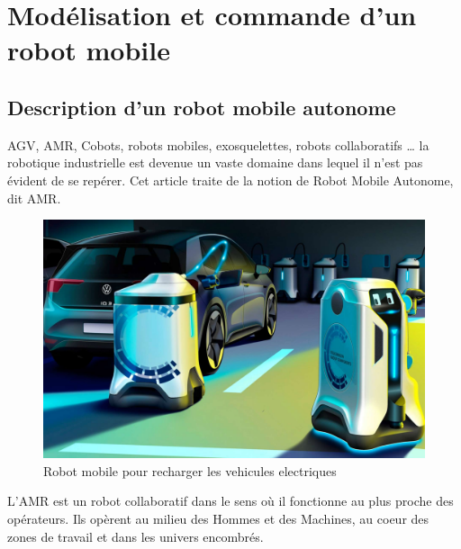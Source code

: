 \chapter{Modélisation et commande d'un robot mobile}
\section{Description d'un robot mobile autonome}
AGV, AMR, Cobots, robots mobiles, exosquelettes, robots collaboratifs … la robotique industrielle est devenue un vaste domaine dans lequel il n’est pas évident de se repérer. Cet article traite de la notion de Robot Mobile Autonome, dit AMR.

\begin{figure}[h]
    \centering
    \includegraphics[width=14cm]{assets/robot_autonome.jpg}
    \caption{Robot mobile pour recharger les vehicules electriques \cite{DescriptionRobotMobile}}
    \label{Tux}
    \end{figure}

L’AMR est un robot collaboratif dans le sens où il fonctionne au plus proche des opérateurs. Ils opèrent au milieu des Hommes et des Machines, au coeur des zones de travail et dans les univers encombrés.

